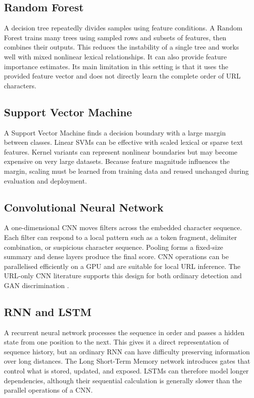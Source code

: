 \subsection{Random Forest}

A decision tree repeatedly divides samples using feature conditions. A Random
Forest trains many trees using sampled rows and subsets of features, then
combines their outputs. This reduces the instability of a single tree and works
well with mixed nonlinear lexical relationships. It can also provide feature
importance estimates. Its main limitation in this setting is that it uses the
provided feature vector and does not directly learn the complete order of URL
characters.

\subsection{Support Vector Machine}

A Support Vector Machine finds a decision boundary with a large margin between
classes. Linear SVMs can be effective with scaled lexical or sparse text
features. Kernel variants can represent nonlinear boundaries but may become
expensive on very large datasets. Because feature magnitude influences the
margin, scaling must be learned from training data and reused unchanged during
evaluation and deployment.

\subsection{Convolutional Neural Network}

A one-dimensional CNN moves filters across the embedded character sequence.
Each filter can respond to a local pattern such as a token fragment, delimiter
combination, or suspicious character sequence. Pooling forms a fixed-size
summary and dense layers produce the final score. CNN operations can be
parallelised efficiently on a GPU and are suitable for local URL inference.
The URL-only CNN literature supports this design for both ordinary detection and
GAN discrimination \citep{alalyan2020robust,alahmadi2022pdgan}.

\subsection{RNN and LSTM}

A recurrent neural network processes the sequence in order and passes a hidden
state from one position to the next. This gives it a direct representation of
sequence history, but an ordinary RNN can have difficulty preserving
information over long distances. The Long Short-Term Memory network introduces
gates that control what is stored, updated, and exposed. LSTMs can therefore
model longer dependencies, although their sequential calculation is generally
slower than the parallel operations of a CNN.


